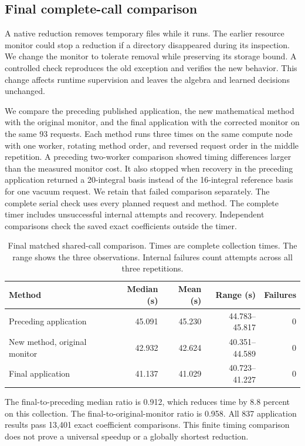 \subsection{Final complete-call comparison}
A native reduction removes temporary files while it runs. The earlier resource monitor could stop a reduction if a directory disappeared during its inspection. We change the monitor to tolerate removal while preserving its storage bound. A controlled check reproduces the old exception and verifies the new behavior. This change affects runtime supervision and leaves the algebra and learned decisions unchanged.

We compare the preceding published application, the new mathematical method with the original monitor, and the final application with the corrected monitor on the same 93 requests. Each method runs three times on the same compute node with one worker, rotating method order, and reversed request order in the middle repetition. A preceding two-worker comparison showed timing differences larger than the measured monitor cost. It also stopped when recovery in the preceding application returned a 20-integral basis instead of the 16-integral reference basis for one vacuum request. We retain that failed comparison separately. The complete serial check uses every planned request and method. The complete timer includes unsuccessful internal attempts and recovery. Independent comparisons check the saved exact coefficients outside the timer.
\begin{table}[htbp]\centering\small
\caption{Final matched shared-call comparison. Times are complete collection times. The range shows the three observations. Internal failures count attempts across all three repetitions.}
\label{tab:triangle-final}
\begin{tabular}{lrrrr}\toprule
Method & Median (s) & Mean (s) & Range (s) & Failures\\\midrule
Preceding application & 45.091 & 45.230 & 44.783--45.817 & 0 \\
New method, original monitor & 42.932 & 42.624 & 40.351--44.589 & 0 \\
Final application & 41.137 & 41.029 & 40.723--41.227 & 0 \\
\bottomrule\end{tabular}\end{table}
The final-to-preceding median ratio is 0.912, which reduces time by 8.8 percent on this collection. The final-to-original-monitor ratio is 0.958. All 837 application results pass 13,401 exact coefficient comparisons. This finite timing comparison does not prove a universal speedup or a globally shortest reduction.
